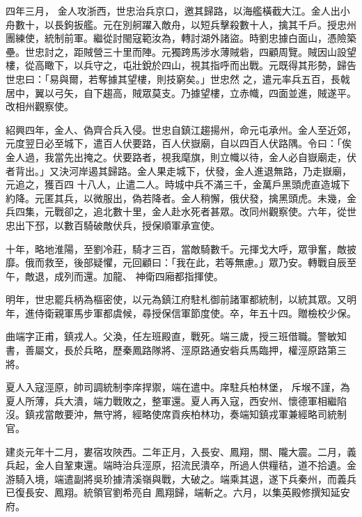 \begin{pinyinscope}
 四年三月，
 金人攻浙西，世忠治兵京口，邀其歸路，以海艦橫截大江。金人出小舟數十，以長鉤扳艦。元在別舸躍入敵舟，以短兵擊殺數十人，擒其千戶。授忠州團練使，統制前軍。繼從討閩寇範汝為，轉討湖外諸盜。時劉忠據白面山，憑險築壘。世忠討之，距賊營三十里而陣。元獨跨馬涉水薄賊砦，四顧周覽。賊因山設望樓，從高瞰下，以兵守之，屯壯銳於四山，視其指呼而出戰。元既得其形勢，歸告世忠曰：「易與爾，若奪據其望樓，則技窮矣。」世忠然
 之，遣元率兵五百，長戟居中，翼以弓矢，自下趨高，賊眾莫支。乃據望樓，立赤幟，四面並進，賊遂平。改相州觀察使。



 紹興四年，金人、偽齊合兵入侵。世忠自鎮江趨揚州，命元屯承州。金人至近郊，元度翌日必至城下，遣百人伏要路，百人伏嶽廟，自以四百人伏路隅。令曰：「俟金人過，我當先出掩之。伏要路者，視我麾旗，則立幟以待，金人必自嶽廟走，伏者背出。」又決河岸遏其歸路。金人果走城下，伏發，金人進退無路，乃走嶽廟，元追之，獲百四
 十八人，止遣二人。時城中兵不滿三千，金萬戶黑頭虎直造城下約降。元匿其兵，以微服出，偽若降者。金人稍懈，俄伏發，擒黑頭虎。未幾，金兵四集，元戰卻之，追北數十里，金人赴水死者甚眾。改同州觀察使。六年，從世忠出下邳，以數百騎破敵伏兵，授保順軍承宣使。



 十年，略地淮陽，至劉冷莊，騎才三百，當敵騎數千。元揮戈大呼，眾爭奮，敵披靡。俄而救至，後部疑懼，元回顧曰：「我在此，若等無慮。」眾乃安。轉戰自辰至午，敵退，成列而還。加龍、
 神衛四廂都指揮使。



 明年，世忠罷兵柄為樞密使，以元為鎮江府駐札御前諸軍都統制，以統其眾。又明年，進侍衛親軍馬步軍都虞候，尋授保信軍節度使。卒，年五十四。贈檢校少保。



 曲端字正甫，鎮戎人。父渙，任左班殿直，戰死。端三歲，授三班借職。警敏知書，善屬文，長於兵略，歷秦鳳路隊將、涇原路通安砦兵馬臨押，權涇原路第三將。



 夏人入寇涇原，帥司調統制李庠捍禦，端在遣中。庠駐兵柏林堡，
 斥堠不謹，為夏人所薄，兵大潰，端力戰敗之，整軍還。夏人再入寇，西安州、懷德軍相繼陷沒。鎮戎當敵要沖，無守將，經略使席貢疾柏林功，奏端知鎮戎軍兼經略司統制官。



 建炎元年十二月，婁宿攻陜西。二年正月，入長安、鳳翔，關、隴大震。二月，義兵起，金人自鞏東還。端時治兵涇原，招流民潰卒，所過人供糧秸，道不拾遺。金游騎入境，端遣副將吳玠據清溪嶺與戰，大破之。端乘其退，遂下兵秦州，而義兵已復長安、鳳翔。統領官劉希亮自
 鳳翔歸，端斬之。六月，以集英殿修撰知延安府。




\end{pinyinscope}
